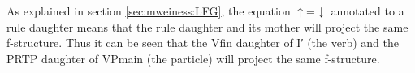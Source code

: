 \documentclass[output=paper]{langsci/langscibook}
\begin{document}


%
%

As explained in section \ref{sec:mweiness:LFG}, the equation $\uparrow$=$\downarrow$ annotated to a rule daughter means that the rule daughter and its mother will project the same f-structure.
Thus it can be seen that the Vfin daughter of I′ (the verb) and the PRTP daughter of VPmain (the particle) will project the same f-structure.
\end{document}
